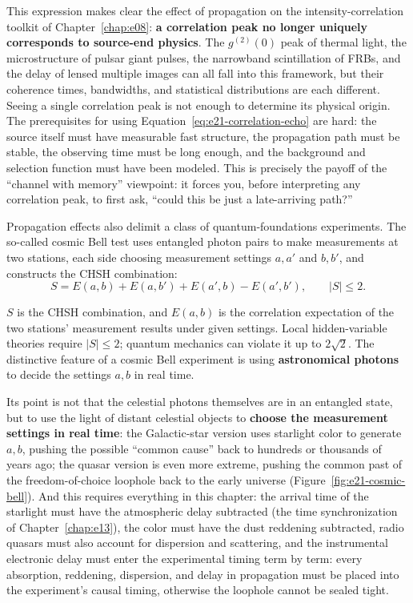 This expression makes clear the effect of propagation on the intensity-correlation toolkit of Chapter~\ref{chap:e08}: \textbf{a correlation peak no longer uniquely corresponds to source-end physics}. The \(g^{(2)}(0)\) peak of thermal light, the microstructure of pulsar giant pulses, the narrowband scintillation of FRBs, and the delay of lensed multiple images can all fall into this framework, but their coherence times, bandwidths, and statistical distributions are each different. Seeing a single correlation peak is not enough to determine its physical origin. The prerequisites for using Equation~\eqref{eq:e21-correlation-echo} are hard: the source itself must have measurable fast structure, the propagation path must be stable, the observing time must be long enough, and the background and selection function must have been modeled. This is precisely the payoff of the ``channel with memory'' viewpoint: it forces you, before interpreting any correlation peak, to first ask, ``could this be just a late-arriving path?''

Propagation effects also delimit a class of quantum-foundations experiments. The so-called cosmic Bell test uses entangled photon pairs to make measurements at two stations, each side choosing measurement settings \(a,a'\) and \(b,b'\), and constructs the CHSH combination:
\begin{equation}
  S
  =
  E(a,b)+E(a,b')+E(a',b)-E(a',b'),
  \qquad
  |S|\le 2 .
  \label{eq:e21-chsh}
\end{equation}
\begin{formulaexplain}
\(S\) is the CHSH combination, and \(E(a,b)\) is the correlation expectation of the two stations' measurement results under given settings. Local hidden-variable theories require \(|S|\le2\); quantum mechanics can violate it up to \(2\sqrt2\). The distinctive feature of a cosmic Bell experiment is using \textbf{astronomical photons} to decide the settings \(a,b\) in real time.
\end{formulaexplain}
Its point is not that the celestial photons themselves are in an entangled state, but to use the light of distant celestial objects to \textbf{choose the measurement settings in real time}: the Galactic-star version uses starlight color to generate \(a,b\), pushing the possible ``common cause'' back to hundreds or thousands of years ago; the quasar version is even more extreme, pushing the common past of the freedom-of-choice loophole back to the early universe \citep{2017PhRvL.118f0401H,2018PhRvL.121h0403R} (Figure~\ref{fig:e21-cosmic-bell}). And this requires everything in this chapter: the arrival time of the starlight must have the atmospheric delay subtracted (the time synchronization of Chapter~\ref{chap:e13}), the color must have the dust reddening subtracted, radio quasars must also account for dispersion and scattering, and the instrumental electronic delay must enter the experimental timing term by term: every absorption, reddening, dispersion, and delay in propagation must be placed into the experiment's causal timing, otherwise the loophole cannot be sealed tight.


